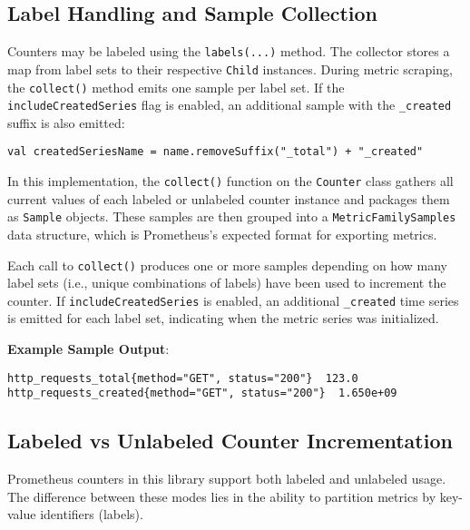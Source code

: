
\subsection{Label Handling and Sample Collection}
Counters may be labeled using the \texttt{labels(...)} method. The collector stores a map from label sets to their respective \texttt{Child} instances. During metric scraping, the \texttt{collect()} method emits one sample per label set. If the \texttt{includeCreatedSeries} flag is enabled, an additional sample with the \texttt{\_created} suffix is also emitted:
\begin{verbatim}
val createdSeriesName = name.removeSuffix("_total") + "_created"
\end{verbatim}


In this implementation, the \texttt{collect()} function on the \texttt{Counter} class gathers all current values of each labeled or unlabeled counter instance and packages them as \texttt{Sample} objects. These samples are then grouped into a \texttt{MetricFamilySamples} data structure, which is Prometheus's expected format for exporting metrics.

Each call to \texttt{collect()} produces one or more samples depending on how many label sets (i.e., unique combinations of labels) have been used to increment the counter. If \texttt{includeCreatedSeries} is enabled, an additional \texttt{\_created} time series is emitted for each label set, indicating when the metric series was initialized.

\vspace{0.5em}
\noindent
\textbf{Example Sample Output}:
\begin{verbatim}
http_requests_total{method="GET", status="200"}  123.0
http_requests_created{method="GET", status="200"}  1.650e+09
\end{verbatim}

\subsection{Labeled vs Unlabeled Counter Incrementation}

Prometheus counters in this library support both labeled and unlabeled usage. The difference between these modes lies in the ability to partition metrics by key-value identifiers (labels).


